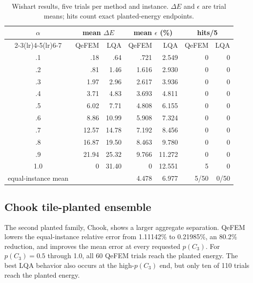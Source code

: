 \documentclass[
  aps,
  prx,
  reprint,
  amsmath,
  amssymb,
  groupedaddress,
  nofootinbib,
  floatfix,
  longbibliography
]{revtex4-2}
\newcommand{\qefem}{QeFEM}
\newcommand{\lqa}{\textsc{LQA}}
\begin{document}
\begin{table}[t]
\caption{Wishart results, five trials per method and instance.  $\Delta E$ and
$\epsilon$ are trial means; hits count exact planted-energy endpoints.}
\label{tab:wishart-results}
\centering
\small
\setlength{\tabcolsep}{5pt}
\begin{tabular}{crrrrrr}
\toprule
$\alpha$ & \multicolumn{2}{c}{mean $\Delta E$} & \multicolumn{2}{c}{mean $\epsilon$ (\%)} & \multicolumn{2}{c}{hits/5} \\
\cmidrule(lr){2-3}\cmidrule(lr){4-5}\cmidrule(lr){6-7}
& \qefem{} & \lqa{} & \qefem{} & \lqa{} & \qefem{} & \lqa{} \\
\midrule
.1&.18&.64&.721&2.549&0&0\\
.2&.81&1.46&1.616&2.930&0&0\\
.3&1.97&2.96&2.617&3.936&0&0\\
.4&3.71&4.83&3.693&4.811&0&0\\
.5&6.02&7.71&4.808&6.155&0&0\\
.6&8.86&10.99&5.908&7.324&0&0\\
.7&12.57&14.78&7.192&8.456&0&0\\
.8&16.87&19.50&8.463&9.780&0&0\\
.9&21.94&25.32&9.766&11.272&0&0\\
1.0&0&31.40&0&12.551&5&0\\
\midrule
equal-instance mean&&&4.478&6.977&5/50&0/50\\
\bottomrule
\end{tabular}
\end{table}

\subsection{Chook tile-planted ensemble}

The second planted family, Chook, shows a larger aggregate separation.
\qefem{} lowers the
equal-instance relative error from 1.11142\% to 0.21985\%, an 80.2\% reduction,
and improves the mean error at every requested $p(C_3)$.  For
$p(C_3)=0.5$ through 1.0, all 60 \qefem{} trials reach the planted energy.
The best \lqa{} behavior also occurs at the high-$p(C_3)$ end, but only ten of
110 trials reach the planted energy.
\end{document}
